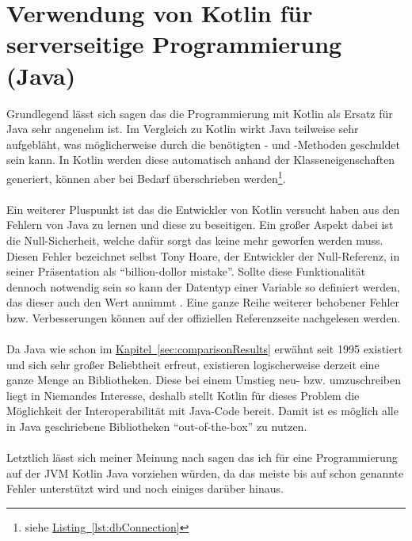 \section{Verwendung von Kotlin für serverseitige Programmierung (Java)}\label{sec:conclusionKotlinJava}
Grundlegend lässt sich sagen das die Programmierung mit Kotlin als Ersatz für Java sehr angenehm ist. Im Vergleich zu Kotlin wirkt Java teilweise sehr aufgebläht, was möglicherweise durch die benötigten - und -Methoden geschuldet sein kann. In Kotlin werden diese automatisch anhand der Klasseneigenschaften generiert, können aber bei Bedarf überschrieben werden\footnote{siehe \hyperref[lst:dbConnection]{Listing~\ref{lst:dbConnection}}}.\\
\\
Ein weiterer Pluspunkt ist das die Entwickler von Kotlin versucht haben aus den Fehlern von Java zu lernen und diese zu beseitigen. Ein großer Aspekt dabei ist die Null-Sicherheit, welche dafür sorgt das keine  mehr geworfen werden muss. Diesen Fehler bezeichnet selbst Tony Hoare, der Entwickler der Null-Referenz, in seiner Präsentation \cite{billionDollorMistake} als \enquote{billion-dollor mistake}. Sollte diese Funktionalität dennoch notwendig sein so kann der Datentyp einer Variable so definiert werden, das dieser auch den Wert  annimmt \cite{kotlinNullSafety}. Eine ganze Reihe weiterer behobener Fehler bzw. Verbesserungen können auf der offiziellen Referenzseite \cite{kotlinComparisionJava} nachgelesen werden.\\
\\
Da Java wie schon im \hyperref[sec:comparisonResults]{Kapitel~\ref{sec:comparisonResults}} erwähnt seit 1995 existiert und sich sehr großer Beliebtheit erfreut, existieren logischerweise derzeit eine ganze Menge an Bibliotheken. Diese bei einem Umstieg neu- bzw. umzuschreiben liegt in Niemandes Interesse, deshalb stellt Kotlin für dieses Problem die Möglichkeit der Interoperabilität mit Java-Code bereit. Damit ist es möglich alle in Java geschriebene Bibliotheken \enquote{out-of-the-box} zu nutzen.\\
\\
Letztlich lässt sich meiner Meinung nach sagen das ich für eine Programmierung auf der \gls{JVM} Kotlin Java vorziehen würden, da das meiste bis auf schon genannte Fehler unterstützt wird und noch einiges darüber hinaus.

